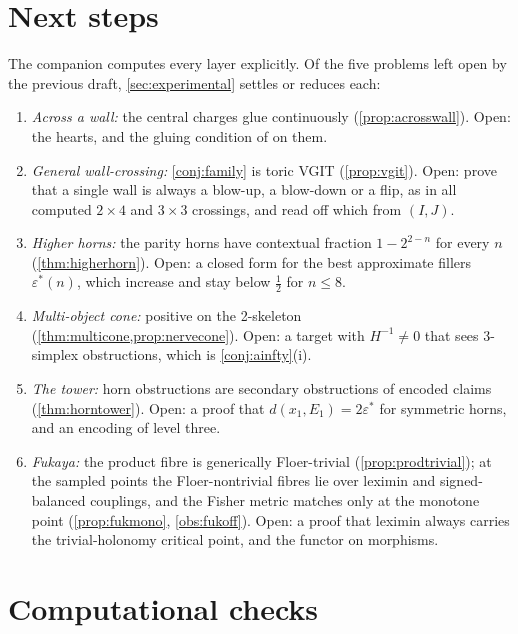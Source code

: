 \documentclass[11pt]{article}
\theoremstyle{definition}
\theoremstyle{remark}
\begin{document}
\section{Next steps}\label{sec:next}

The companion \cite{Awasthi-Family} computes every layer explicitly. Of the five problems left open by the previous
draft, \cref{sec:experimental} settles or reduces each:
\begin{enumerate}[label=(\arabic*),leftmargin=*]
\item \emph{Across a wall:} the central charges glue continuously (\cref{prop:acrosswall}). Open: the hearts, and the
  gluing condition of \cite{CollinsPolishchuk2010} on them.
\item \emph{General wall-crossing:} \cref{conj:family} is toric VGIT (\cref{prop:vgit}). Open: prove that a single wall is
  always a blow-up, a blow-down or a flip, as in all computed $2\times4$ and $3\times3$ crossings, and read off which from
  $(I,J)$.
\item \emph{Higher horns:} the parity horns have contextual fraction $1-2^{2-n}$ for every $n$ (\cref{thm:higherhorn}). Open:
  a closed form for the best approximate fillers $\varepsilon^*(n)$, which increase and stay below $\frac12$ for $n\le8$.
\item \emph{Multi-object cone:} positive on the 2-skeleton (\cref{thm:multicone,prop:nervecone}). Open: a target with
  $H^{-1}\ne0$ that sees 3-simplex obstructions, which is \cref{conj:ainfty}(i).
\item \emph{The tower:} horn obstructions are secondary obstructions of encoded claims (\cref{thm:horntower}). Open: a
  proof that $d(x_1,E_1)=2\varepsilon^*$ for symmetric horns, and an encoding of level three.
\item \emph{Fukaya:} the product fibre is generically Floer-trivial (\cref{prop:prodtrivial}); at the sampled points the
  Floer-nontrivial fibres lie over leximin and signed-balanced couplings, and the Fisher metric matches only at the
  monotone point (\cref{prop:fukmono}, \cref{obs:fukoff}). Open: a proof that leximin always carries the trivial-holonomy
  critical point, and the functor on morphisms.
\end{enumerate}

\section{Computational checks}\label{sec:code}
\end{document}
